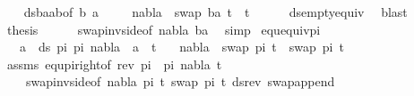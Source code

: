 \begin{isabellebody}
\ \ \isamarkupfalse%
\ ds{\isacharunderscore}{\kern0pt}baab{\isacharbrackleft}{\kern0pt}of\ b\ a{\isacharbrackright}{\kern0pt}\ \isanewline
\ \ \isamarkupfalse%
\ {\isachardoublequoteopen}nabla\ {\isasymturnstile}\ swap\ {\isacharbrackleft}{\kern0pt}{\isacharparenleft}{\kern0pt}b{\isacharcomma}{\kern0pt}a{\isacharparenright}{\kern0pt}{\isacharbrackright}{\kern0pt}\ t{}\ {\isasymapprox}\ t{}{\isachardoublequoteclose}\isanewline
\ \ \ \ \isamarkupfalse%
\ ds{\isacharunderscore}{\kern0pt}empty{\isacharunderscore}{\kern0pt}equiv{\isacharunderscore}{\kern0pt}{}\ \isamarkupfalse%
\ blast\isanewline
\ \ \ \ \isamarkupfalse%
\ \isamarkupfalse%
\ {\isacharquery}{\kern0pt}thesis\isanewline
\ \ \ \ \isamarkupfalse%
\ swap{\isacharunderscore}{\kern0pt}inv{\isacharunderscore}{\kern0pt}side{\isacharbrackleft}{\kern0pt}of\ nabla\ {\isacartoucheopen}{\isacharbrackleft}{\kern0pt}{\isacharparenleft}{\kern0pt}b{\isacharcomma}{\kern0pt}a{\isacharparenright}{\kern0pt}{\isacharbrackright}{\kern0pt}{\isacartoucheclose}{\isacharbrackright}{\kern0pt}\ \isamarkupfalse%
\ simp\isanewline
{}\isamarkupfalse%
%
\endisatagproof
{\isafoldproof}%
%
\isadelimproof
\isanewline
%
\endisadelimproof
\isanewline
{}\isamarkupfalse%
\ equ{\isacharunderscore}{\kern0pt}equiv{\isacharunderscore}{\kern0pt}pi{\isacharcolon}{\kern0pt}\ \isanewline
\ \ \ {\isachardoublequoteopen}{\isasymforall}a\ {\isasymin}\ ds\ pi{}\ pi{}{\isachardot}{\kern0pt}\ nabla\ {\isasymturnstile}\ a\ {\isasymsharp}\ t{\isachardoublequoteclose}\isanewline
\ \ \ {\isachardoublequoteopen}nabla\ {\isasymturnstile}\ swap\ pi{}\ t\ {\isasymapprox}\ swap\ pi{}\ t{\isachardoublequoteclose}\isanewline
%
\isadelimproof
\ \ %
\endisadelimproof
%
\isatagproof
{}\isamarkupfalse%
\ assms\ equ{\isacharunderscore}{\kern0pt}pi{\isacharunderscore}{\kern0pt}right{\isacharbrackleft}{\kern0pt}of\ {\isacartoucheopen}rev\ pi{}\ {\isacharat}{\kern0pt}\ pi{}{\isacartoucheclose}\ nabla\ t{\isacharbrackright}{\kern0pt}\isanewline
\ \ \ \ swap{\isacharunderscore}{\kern0pt}inv{\isacharunderscore}{\kern0pt}side{\isacharbrackleft}{\kern0pt}of\ nabla\ pi{}\ t\ {\isacartoucheopen}swap\ pi{}\ t{\isacartoucheclose}{\isacharbrackright}{\kern0pt}\ ds{\isacharunderscore}{\kern0pt}rev\ swap{\isacharunderscore}{\kern0pt}append\ \isamarkupfalse%

\end{isabellebody}
